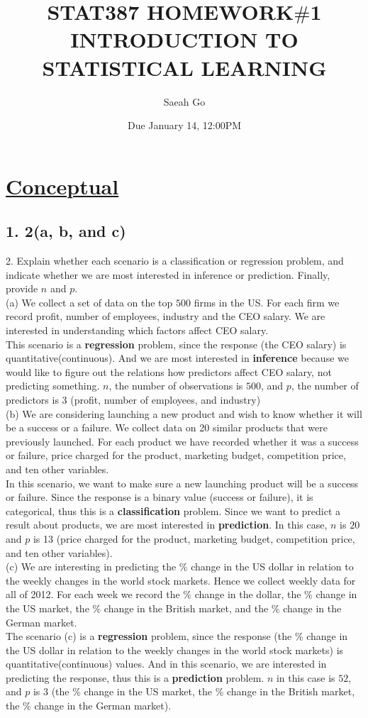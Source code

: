 \documentclass{article}
\title{STAT387 HOMEWORK$\#$1 \linebreak \linebreak
\large INTRODUCTION TO STATISTICAL LEARNING}
\author{Saeah Go}
\date{Due January 14, 12:00PM}
\begin{document}
\maketitle

\section*{\underline{Conceptual}}

\subsection*{1. 2(a, b, and c)}
2. Explain whether each scenario is a classification or regression problem, and indicate whether we are most interested in inference or prediction. Finally, provide $n$ and $p$. \\
(a) We collect a set of data on the top $500$ firms in the US. For each firm we record profit, number of employees, industry and the CEO salary. We are interested in understanding which factors affect CEO salary. \\
\indent\indent This scenario is a \textbf{regression} problem, since the response (the CEO salary) is quantitative(continuous). And we are most interested in \textbf{inference} because we would like to figure out the relations how predictors affect CEO salary, not predicting something. $n$, the number of observations is $500$, and $p$, the number of predictors is $3$ (profit, number of employees, and industry) \\
(b) We are considering launching a new product and wish to know whether it will be a success or a failure. We collect data on 20 similar products that were previously launched. For each product we have recorded whether it was a success or failure, price charged for the product, marketing budget, competition price, and ten other variables. \\
\indent\indent In this scenario, we want to make sure a new launching product will be a success or failure. Since the response is a binary value (success or failure), it is categorical, thus this is a \textbf{classification} problem. Since we want to predict a result about products, we are most interested in \textbf{prediction}. In this case, $n$ is $20$ and $p$ is 13 (price charged for the product, marketing budget, competition price, and ten other variables). \\
(c) We are interesting in predicting the \% change in the US dollar in relation to the weekly changes in the world stock markets. Hence we collect weekly data for all of 2012. For each week we record the \% change in the dollar, the \% change in the US market, the \% change in the British market, and the \% change in the German market. \\
\indent\indent The scenario (c) is a \textbf{regression} problem, since the response (the \% change in the US dollar in relation to the weekly changes in the world stock markets) is quantitative(continuous) values. And in this scenario, we are interested in predicting the response, thus this is a \textbf{prediction} problem. $n$ in this case is $52$, and $p$ is 3 (the \% change in the US market, the \% change in the British market, the \% change in the German market).
\end{document}
